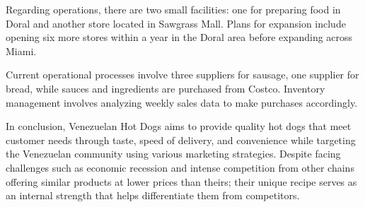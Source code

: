 Regarding operations, there are two small facilities: one for preparing food in Doral and another store located in Sawgrass Mall. Plans for expansion include opening six more stores within a year in the Doral area before expanding across Miami.

Current operational processes involve three suppliers for sausage, one supplier for bread, while sauces and ingredients are purchased from Costco. Inventory management involves analyzing weekly sales data to make purchases accordingly.

In conclusion, Venezuelan Hot Dogs aims to provide quality hot dogs that meet customer needs through taste, speed of delivery, and convenience while targeting the Venezuelan community using various marketing strategies. Despite facing challenges such as economic recession and intense competition from other chains offering similar products at lower prices than theirs; their unique recipe serves as an internal strength that helps differentiate them from competitors.
